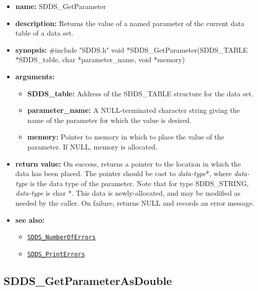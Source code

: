 \documentclass[11pt]{article}
\newcommand{\progref}[1]{\hyperref[SDDS_#1]{\tt SDDS\_#1}}
\begin{document}
\begin{itemize}
\item {\bf name:}\newline
SDDS\_GetParameter
\item {\bf description:}\newline
Returns the value of a named parameter of the current data table of a data set.
\item {\bf synopsis:} \#include "SDDS.h"\newline
void *SDDS\_GetParameter(SDDS\_TABLE *SDDS\_table, char *parameter\_name, void *memory)
\item {\bf arguments:}
\begin{itemize}
\item {\bf SDDS\_table:} Address of the SDDS\_TABLE structure for the data set.
\item {\bf parameter\_name:} A NULL-terminated character string giving the name of the parameter for which the value is desired.
\item {\bf memory:} Pointer to memory in which to place the value of the parameter. If NULL, memory is allocated.
\end{itemize}
\item {\bf return value:}\newline
On success, returns a pointer to the location in which the data has been placed. The pointer should be cast to {\em data-type}*, where {\em data-type} is the data type of the parameter. Note that for type SDDS\_STRING, {\em data-type} is char *. This data is newly-allocated, and may be modified as needed by the caller. On failure, returns NULL and records an error message.
\item {\bf see also:}
\begin{itemize}
\item \progref{NumberOfErrors}
\item \progref{PrintErrors}
\end{itemize}
\end{itemize}

\subsection{SDDS\_GetParameterAsDouble}
\label{SDDS_GetParameterAsDouble}
\end{document}
